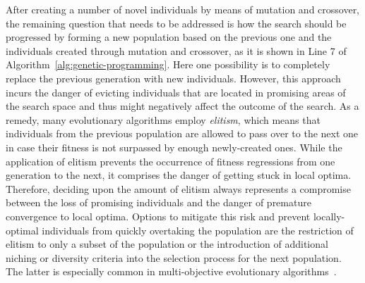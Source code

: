After creating a number of novel individuals by means of mutation and crossover, the remaining question that needs to be addressed is how the search should be progressed by forming a new population based on the previous one and the individuals created through mutation and crossover, as it is shown in Line 7 of Algorithm~\ref{alg:genetic-programming}.
Here one possibility is to completely replace the previous generation with new individuals.
However, this approach incurs the danger of evicting individuals that are located in promising areas of the search space and thus might negatively affect the outcome of the search.
As a remedy, many evolutionary algorithms employ \emph{elitism}, which means that individuals from the previous population are allowed to pass over to the next one in case their fitness is not surpassed by enough newly-created ones.
While the application of elitism prevents the occurrence of fitness regressions from one generation to the next, it comprises the danger of getting stuck in local optima.
Therefore, deciding upon the amount of elitism always represents a compromise between the loss of promising individuals and the danger of premature convergence to local optima.
Options to mitigate this risk and prevent locally-optimal individuals from quickly overtaking the population are the restriction of elitism to only a subset of the population or the introduction of additional niching or diversity criteria into the selection process for the next population. 
The latter is especially common in multi-objective evolutionary algorithms~\cite{coello2007evolutionary}.